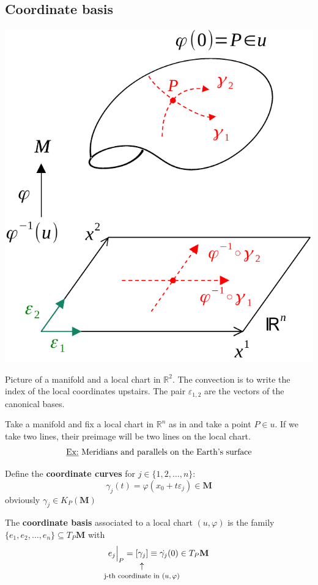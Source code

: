 \documentclass[../main.tex]{subfiles}
\begin{document}
\subsection{Coordinate basis}
\begin{marginfigure}
	\includegraphics[width=1.3\linewidth]{images/coord_basis.pdf}
	\caption[Coordinate bases]{Picture of a manifold and a local chart in $\mathbb{R}^2$. The convection is to write the index of the local coordinates upstairs. The pair $\varepsilon_{1,2}$ are the vectors of the canonical bases.}
\end{marginfigure} 
Take a manifold and fix a local chart in $\mathbb{R}^n$ as in  and take a point $P\in u$. If we take two lines, their preimage will be two lines on the local chart. 
\[
\textrm{\underline{Ex:} Meridians and parallels on the Earth's surface}
\]
\begin{definition}
Define the \textbf{coordinate curves} for $j \in \{1,2,\dots,n\}$:
\[
\gamma_j(t)=\varphi(x_0+t\varepsilon_j)\in\mathbf{M}
\]
obviously \(\gamma_j\in K_P(\mathbf{M})\)
\end{definition}
\begin{definition}
The \textbf{coordinate basis} associated to a local chart $(u,\varphi)$ is the family $\{e_1,e_2,\dots,e_n\}\subseteq T_P\mathbf{M}$ with\
\[
e_j\Bigr|_{\substack{P}}=[\underset{\mathclap{\tikz \node {$\uparrow$} node [below=1ex] {\footnotesize j-th coordinate in $(u,\varphi)$};}}{\gamma_j}]\equiv\Dot{\gamma_j}(0)\in T_P \mathbf{M}
\]
\end{definition}
\end{document}
